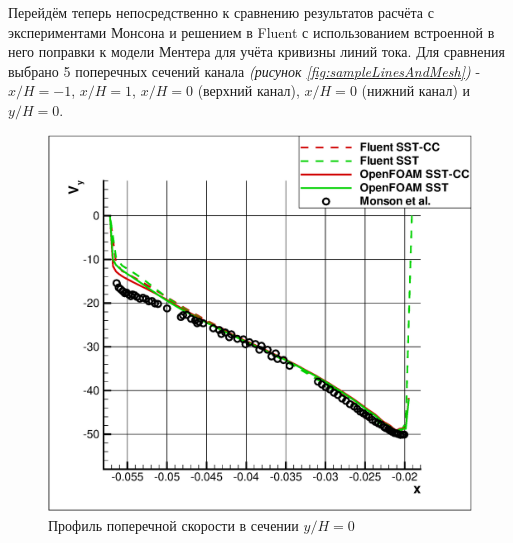 Перейдём теперь непосредственно к сравнению результатов расчёта с экспериментами Монсона и решением в Fluent с использованием встроенной в него поправки к модели Ментера для учёта кривизны линий тока. Для сравнения выбрано 5 поперечных сечений канала \textit{(рисунок \ref{fig:sampleLinesAndMesh})} - $x/H=-1$, $x/H = 1$, $x/H = 0$ (верхний канал), $x/H = 0$ (нижний канал) и $y/H=0$.
\begin{figure}[h]
	\centering
	\includegraphics[scale=0.55]{yh0}
	\caption{Профиль поперечной скорости в сечении $y/H=0$}
	\label{fig:y0}
\end{figure}
